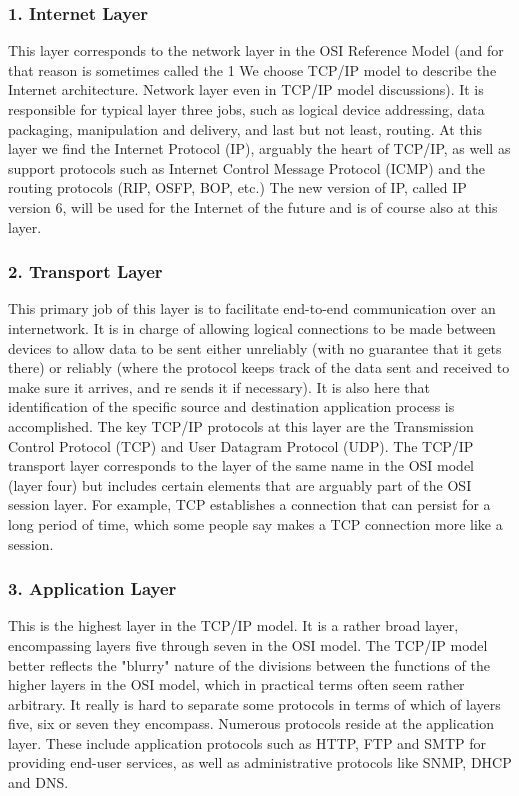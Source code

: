 \documentclass{article}
\begin{document}
  \subsubsection{1. Internet Layer}

This layer corresponds to the network layer in the OSI Reference Model (and for that reason is sometimes called the
1 We choose TCP/IP model to describe the Internet architecture. Network layer even in TCP/IP model discussions). It is responsible for typical layer three jobs, such as logical device addressing, data packaging, manipulation and delivery, and last but not least, routing. At this layer we find the Internet Protocol (IP), arguably the heart of TCP/IP, as well as support protocols such as Internet Control Message Protocol (ICMP) and the routing protocols (RIP, OSFP, BOP, etc.) The new version of IP, called IP version 6, will be used for the Internet of the future and is of course also at this layer.

 \subsubsection{2. Transport Layer}

 This primary job of this layer is to facilitate end-to-end communication over an internetwork. It is in charge of allowing logical connections to be made between devices to allow data to be sent either unreliably (with no guarantee that it gets there) or reliably (where the protocol keeps track of the data sent and received to make sure it arrives, and re­ sends it if necessary). It is also here that identification of the specific source and destination application process is accomplished. The key TCP/IP protocols at this layer are the Transmission Control Protocol (TCP) and User Datagram Protocol (UDP). The TCP/IP transport layer corresponds to the layer of the same name in the OSI model (layer four) but includes certain elements that are arguably part of the OSI session layer. For example, TCP establishes a connection that can persist for a long period of time, which some people say makes a TCP connection more like a session.


\subsubsection{3. Application Layer}

This is the highest layer in the TCP/IP model. It is a rather broad layer, encompassing layers five through seven in the OSI model. The TCP/IP model better reflects the "blurry" nature of the divisions between the functions of the higher layers in the OSI model, which in practical terms often seem rather arbitrary. It really is hard to separate some protocols in terms of which of layers five, six or seven they encompass.
Numerous protocols reside at the application layer. These include application protocols such as HTTP, FTP and SMTP for providing end-user services, as well as administrative protocols like SNMP, DHCP and DNS.
\end{document}
